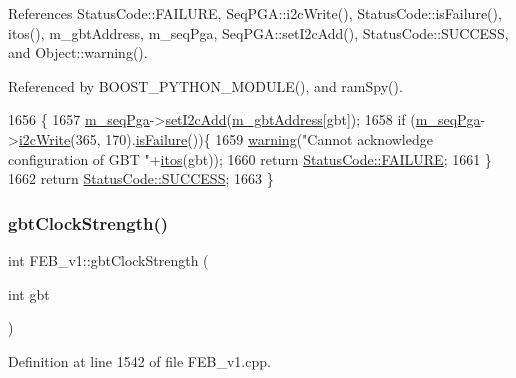 References Status\+Code\+::\+F\+A\+I\+L\+U\+RE, Seq\+P\+G\+A\+::i2c\+Write(), Status\+Code\+::is\+Failure(), itos(), m\+\_\+gbt\+Address, m\+\_\+seq\+Pga, Seq\+P\+G\+A\+::set\+I2c\+Add(), Status\+Code\+::\+S\+U\+C\+C\+E\+SS, and Object\+::warning().



Referenced by B\+O\+O\+S\+T\+\_\+\+P\+Y\+T\+H\+O\+N\+\_\+\+M\+O\+D\+U\+L\+E(), and ram\+Spy().


\begin{DoxyCode}
1656                                               \{
1657   \hyperlink{classFEB__v1_a6c7804ac86796f233a8393043adf2e77}{m\_seqPga}->\hyperlink{classSeqPGA_a4ef334e4d2cb417b49033dce951728cd}{setI2cAdd}(\hyperlink{classFEB__v1_ac625855df976f16694178f1a4c0eef1e}{m\_gbtAddress}[gbt]);
1658   \textcolor{keywordflow}{if} (\hyperlink{classFEB__v1_a6c7804ac86796f233a8393043adf2e77}{m\_seqPga}->\hyperlink{classSeqPGA_a429076ca3a4ece94182bd95c623bb9d0}{i2cWrite}(365, 170).\hyperlink{classStatusCode_a5dd22dc6eb2c52fc4cabc58f6dea2eb7}{isFailure}())\{
1659     \hyperlink{classObject_a65cd4fda577711660821fd2cd5a3b4c9}{warning}(\textcolor{stringliteral}{"Cannot acknowledge configuration of GBT "}+\hyperlink{Tools_8h_af330027dbdafb9a30768b3613c553e60}{itos}(gbt));
1660     \textcolor{keywordflow}{return} \hyperlink{classStatusCode_a6f565cbeadc76d14c72f047e5e85eb4ba3da73d4c469762eb9d3c960368252b26}{StatusCode::FAILURE};
1661   \}
1662   \textcolor{keywordflow}{return} \hyperlink{classStatusCode_a6f565cbeadc76d14c72f047e5e85eb4badd0da38d3ba0d922efd1f4619bc37ad8}{StatusCode::SUCCESS};
1663 \}
\end{DoxyCode}
\mbox{\label{classFEB__v1_a6ca15de02d32e38a0fc90ad29302072e}} 
\subsubsection{\texorpdfstring{gbt\+Clock\+Strength()}{gbtClockStrength()}}
{\footnotesize\ttfamily int F\+E\+B\+\_\+v1\+::gbt\+Clock\+Strength (\begin{DoxyParamCaption}\item[{int}]{gbt }\end{DoxyParamCaption})}



Definition at line 1542 of file F\+E\+B\+\_\+v1.\+cpp.



